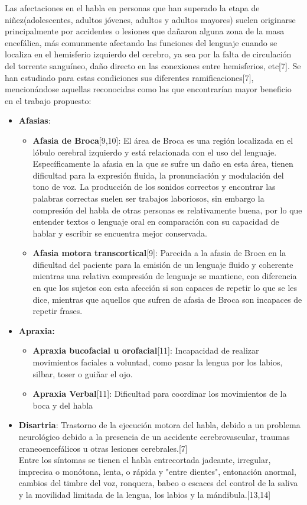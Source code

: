 \hfill \break
\justifying
Las afectaciones en el habla en personas que han superado la etapa de niñez(adolescentes, adultos jóvenes, adultos y adultos mayores) suelen originarse principalmente por accidentes o lesiones que dañaron alguna zona de la masa encefálica, más comunmente afectando las funciones del lenguaje cuando se localiza en el hemisferio izquierdo del cerebro, ya sea por la falta de circulación del torrente sanguíneo, daño directo en las conexiones entre hemisferios, etc[7]. Se han estudiado para estas condiciones sus diferentes ramificaciones[7], mencionándose aquellas reconocidas como las que encontrarían mayor beneficio en el trabajo propuesto:
\begin{itemize}
	\item \textbf{Afasias}:
		\begin{itemize}
			\item \textbf{Afasia de Broca}[9,10]: El área de Broca es una región localizada en el lóbulo cerebral izquierdo y está relacionada con el uso del lenguaje. Específicamente la afasia en la que se sufre un daño en esta área, tienen dificultad para la expresión fluida, la pronunciación y modulación del tono de voz. La producción de los sonidos correctos y encontrar las palabras correctas suelen ser trabajos laboriosos, sin embargo la compresión del habla de otras personas es relativamente buena, por lo que entender textos o lenguaje oral en comparación con su capacidad de hablar y escribir se encuentra mejor conservada.
			\item \textbf{Afasia motora transcortical}[9]: Parecida a la afasia de Broca en la dificultad del paciente para la emisión de un lenguaje fluido y coherente mientras una relativa compresión de lenguaje se mantiene, con diferencia en que los sujetos con esta afección si son capaces de repetir lo que se les dice, mientras que aquellos que sufren de afasia de Broca son incapaces de repetir frases.
		\end{itemize}
	\item \textbf{Apraxia:}
	\begin{itemize}
		\item \textbf{Apraxia bucofacial u orofacial}[11]: Incapacidad de realizar movimientos faciales a voluntad, como pasar la lengua por los labios, silbar, toser o guiñar el ojo.
		\item \textbf{Apraxia Verbal}[11]: Dificultad para coordinar los movimientos de la boca y del habla
	\end{itemize}
	\item \textbf{Disartria}: Trastorno de la ejecución motora del habla, debido a un problema neurológico debido a la presencia de un accidente cerebrovascular, traumas craneoencefálicos u otras lesiones cerebrales.[7] \\ Entre los síntomas se tienen el habla entrecortada jadeante, irregular, imprecisa o monótona, lenta, o rápida y "entre dientes", entonación anormal, cambios del timbre del voz, ronquera, babeo o escaces del control de la saliva y la movilidad limitada de la lengua, los labios y la mándibula.[13,14]
\end{itemize}

